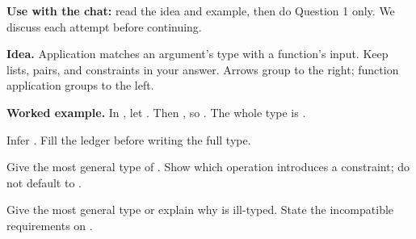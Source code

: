 


\textbf{Use with the chat:} read the idea and example, then do Question 1 only.
We discuss each attempt before continuing.

\textbf{Idea.} Application matches an argument's type with a function's input.
Keep lists, pairs, and constraints in your answer. Arrows group to the right;
function application groups to the left.

\textbf{Worked example.} In , let .
Then , so .
The whole type is .

Infer . Fill the ledger before writing the full type.

Give the most general type of \code{\xs -> [even x | x <- xs]}.
Show which operation introduces a constraint; do not default to .

Give the most general type or explain why 
is ill-typed. State the incompatible requirements on .



